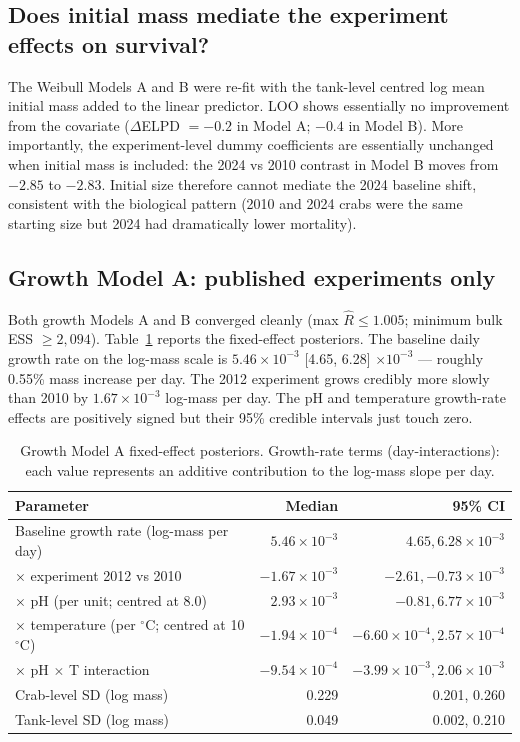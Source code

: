 \documentclass[11pt]{article}
\begin{document}
\subsection{Does initial mass mediate the experiment effects on survival?}
\label{sec:results-mass-surv}
The Weibull Models A and B were re-fit with the tank-level centred log mean initial mass added to the linear predictor. LOO shows essentially no improvement from the covariate ($\Delta$ELPD $= -0.2$ in Model A; $-0.4$ in Model B). More importantly, the experiment-level dummy coefficients are essentially unchanged when initial mass is included: the 2024 vs 2010 contrast in Model B moves from $-2.85$ to $-2.83$. Initial size therefore cannot mediate the 2024 baseline shift, consistent with the biological pattern (2010 and 2024 crabs were the same starting size but 2024 had dramatically lower mortality).

\subsection{Growth Model A: published experiments only}
Both growth Models A and B converged cleanly (max $\hat R \le 1.005$; minimum bulk ESS $\ge 2{,}094$). Table~\ref{tab:growth-A} reports the fixed-effect posteriors. The baseline daily growth rate on the log-mass scale is $5.46 \times 10^{-3}$ [4.65, 6.28] $\times 10^{-3}$ --- roughly 0.55\% mass increase per day. The 2012 experiment grows credibly more slowly than 2010 by $1.67 \times 10^{-3}$ log-mass per day. The pH and temperature growth-rate effects are positively signed but their 95\% credible intervals just touch zero.

\begin{table}[h]
\centering\small
\begin{tabular}{lrr}
\toprule
Parameter & Median & 95\% CI \\
\midrule
Baseline growth rate (log-mass per day) & $5.46 \times 10^{-3}$ & $4.65, 6.28 \times 10^{-3}$ \\
$\times$ experiment 2012 vs 2010 & $-1.67 \times 10^{-3}$ & $-2.61, -0.73 \times 10^{-3}$ \\
$\times$ pH (per unit; centred at 8.0) & $2.93 \times 10^{-3}$ & $-0.81, 6.77 \times 10^{-3}$ \\
$\times$ temperature (per $^\circ$C; centred at 10$^\circ$C) & $-1.94 \times 10^{-4}$ & $-6.60 \times 10^{-4}, 2.57 \times 10^{-4}$ \\
$\times$ pH $\times$ T interaction & $-9.54 \times 10^{-4}$ & $-3.99 \times 10^{-3}, 2.06 \times 10^{-3}$ \\
Crab-level SD (log mass) & 0.229 & 0.201, 0.260 \\
Tank-level SD (log mass) & 0.049 & 0.002, 0.210 \\
\bottomrule
\end{tabular}
\caption{Growth Model A fixed-effect posteriors. Growth-rate terms (day-interactions): each value represents an additive contribution to the log-mass slope per day.}
\label{tab:growth-A}
\end{table}
\end{document}
